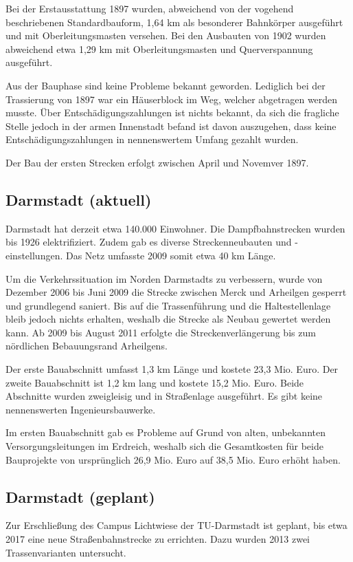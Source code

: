 Bei der Erstausstattung 1897 wurden, abweichend von der vogehend beschriebenen
Standardbauform, 1,64 km als besonderer Bahnkörper ausgeführt und mit Oberleitungsmasten
versehen.
Bei den Ausbauten von 1902 wurden abweichend etwa 1,29 km mit Oberleitungsmasten und
Querverspannung ausgeführt.

Aus der Bauphase sind keine Probleme bekannt geworden. Lediglich bei der Trassierung von
1897 war ein Häuserblock im Weg, welcher abgetragen werden musste. Über
Entschädigungszahlungen ist nichts bekannt, da sich die fragliche Stelle jedoch in der
armen Innenstadt befand ist davon auszugehen, dass keine Entschädigungszahlungen in
nennenswertem Umfang gezahlt wurden.

Der Bau der ersten Strecken erfolgt zwischen April und Novemver 1897.

\subsection{Darmstadt (aktuell)}
Darmstadt hat derzeit etwa 140.000 Einwohner. Die Dampfbahnstrecken wurden bis 1926
elektrifiziert. Zudem gab es diverse Streckenneubauten und -einstellungen. Das Netz
umfasste 2009 somit etwa 40 km Länge.

Um die Verkehrssituation im Norden Darmstadts zu verbessern, wurde von Dezember 2006
bis Juni 2009 die Strecke zwischen Merck und Arheilgen gesperrt und grundlegend saniert.
Bis auf die Trassenführung und die Haltestellenlage bleib jedoch nichts erhalten, weshalb
die Strecke als Neubau gewertet werden kann. Ab 2009 bis August 2011 erfolgte die
Streckenverlängerung bis zum nördlichen Bebauungsrand Arheilgens.

Der erste Bauabschnitt umfasst 1,3 km Länge und kostete 23,3 Mio. Euro. Der zweite
Bauabschnitt ist 1,2 km lang und kostete 15,2 Mio. Euro. Beide Abschnitte wurden
zweigleisig und in Straßenlage ausgeführt. Es gibt keine nennenswerten Ingenieursbauwerke.

Im ersten Bauabschnitt gab es Probleme auf Grund von alten, unbekannten
Versorgungsleitungen im Erdreich, weshalb sich die Gesamtkosten für beide Bauprojekte von
ursprünglich 26,9 Mio. Euro auf 38,5 Mio. Euro erhöht haben.

\subsection{Darmstadt (geplant)}
Zur Erschließung des Campus Lichtwiese der TU-Darmstadt ist geplant, bis etwa 2017 eine neue
Straßenbahnstrecke zu errichten. Dazu wurden 2013 zwei Trassenvarianten untersucht.


